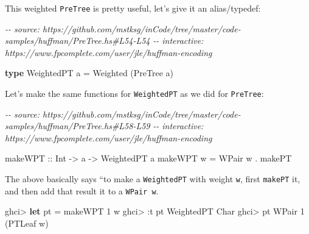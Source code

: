 \documentclass[]{article}
\newenvironment{Shaded}{}{}
\newcommand{\CharTok}[1]{\textcolor[rgb]{0.25,0.44,0.63}{#1}}
\newcommand{\CommentTok}[1]{\textcolor[rgb]{0.38,0.63,0.69}{\textit{#1}}}
\newcommand{\DataTypeTok}[1]{\textcolor[rgb]{0.56,0.13,0.00}{#1}}
\newcommand{\DecValTok}[1]{\textcolor[rgb]{0.25,0.63,0.44}{#1}}
\newcommand{\KeywordTok}[1]{\textcolor[rgb]{0.00,0.44,0.13}{\textbf{#1}}}
\newcommand{\NormalTok}[1]{#1}
\newcommand{\OperatorTok}[1]{\textcolor[rgb]{0.40,0.40,0.40}{#1}}
\newcommand{\OtherTok}[1]{\textcolor[rgb]{0.00,0.44,0.13}{#1}}
\begin{document}
This weighted \texttt{PreTree} is pretty useful, let's give it an alias/typedef:

\begin{Shaded}
\begin{Highlighting}[]
\CommentTok{{-}{-} source: https://github.com/mstksg/inCode/tree/master/code{-}samples/huffman/PreTree.hs\#L54{-}L54}
\CommentTok{{-}{-} interactive: https://www.fpcomplete.com/user/jle/huffman{-}encoding}

\KeywordTok{type} \DataTypeTok{WeightedPT}\NormalTok{ a }\OtherTok{=} \DataTypeTok{Weighted}\NormalTok{ (}\DataTypeTok{PreTree}\NormalTok{ a)}
\end{Highlighting}
\end{Shaded}

Let's make the same functions for \texttt{WeightedPT} as we did for
\texttt{PreTree}:

\begin{Shaded}
\begin{Highlighting}[]
\CommentTok{{-}{-} source: https://github.com/mstksg/inCode/tree/master/code{-}samples/huffman/PreTree.hs\#L58{-}L59}
\CommentTok{{-}{-} interactive: https://www.fpcomplete.com/user/jle/huffman{-}encoding}

\OtherTok{makeWPT ::} \DataTypeTok{Int} \OtherTok{{-}\textgreater{}}\NormalTok{ a }\OtherTok{{-}\textgreater{}} \DataTypeTok{WeightedPT}\NormalTok{ a}
\NormalTok{makeWPT w }\OtherTok{=} \DataTypeTok{WPair}\NormalTok{ w }\OperatorTok{.}\NormalTok{ makePT}
\end{Highlighting}
\end{Shaded}

The above basically says ``to make a \texttt{WeightedPT} with weight \texttt{w},
first \texttt{makePT} it, and then add that result it to a \texttt{WPair\ w}.

\begin{Shaded}
\begin{Highlighting}[]
\NormalTok{ghci}\OperatorTok{\textgreater{}} \KeywordTok{let}\NormalTok{ pt }\OtherTok{=}\NormalTok{ makeWPT }\DecValTok{1} \CharTok{\textquotesingle{}w\textquotesingle{}}
\NormalTok{ghci}\OperatorTok{\textgreater{}} \OperatorTok{:}\NormalTok{t pt}
\DataTypeTok{WeightedPT} \DataTypeTok{Char}
\NormalTok{ghci}\OperatorTok{\textgreater{}}\NormalTok{ pt}
\DataTypeTok{WPair} \DecValTok{1}\NormalTok{ (}\DataTypeTok{PTLeaf} \CharTok{\textquotesingle{}w\textquotesingle{}}\NormalTok{)}
\end{Highlighting}
\end{Shaded}
\end{document}
